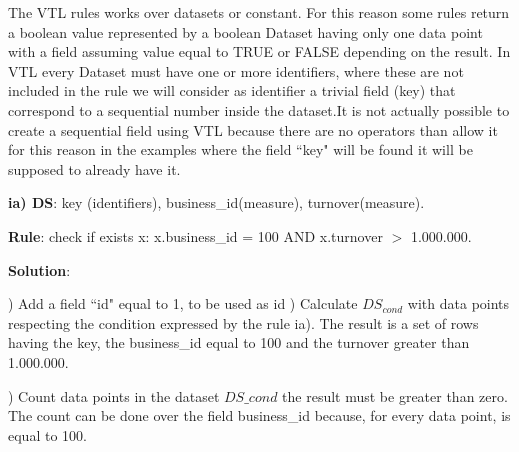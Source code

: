 \bigskip\noindent
The VTL rules works over datasets or constant. For this reason some rules return a boolean value represented by a boolean Dataset  having only one data point with a field assuming value equal to TRUE or FALSE depending on the result.
\noindent
In VTL every Dataset must have one or more identifiers, where these are not included in the rule we will consider as identifier a trivial field (key) that correspond to a sequential number inside the dataset.It is not actually possible to create a sequential field using VTL because there are no operators than allow it for this reason in the examples where the field ``key" will be found it will be supposed to already have it. 



\noindent
\textbf{ia) DS}: key (identifiers), business\_id(measure), turnover(measure).

\bigskip\noindent
\textbf{Rule}: check if exists x: x.business\_id = 100 AND x.turnover $>$ 1.000.000. 


\bigskip\noindent
\textbf{Solution}:

) Add a field ``id" equal to 1, to be used as id
) Calculate $  DS_{cond} $ with data points respecting the condition expressed by the rule ia). The result is a set of rows having the key, the business\_id equal to 100 and the turnover greater than 1.000.000.

%

) Count data points in the dataset $  DS\_{cond}  $  the result must be greater than zero. The count can be done over the field business\_id because, for every data point, is equal to 100.

%

